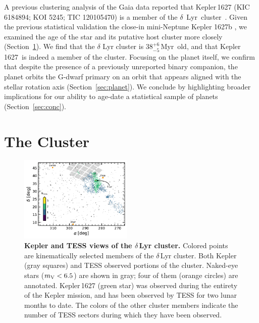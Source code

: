 \documentclass[12pt,modern,twocolumn,tighten]{aastex63}
\newcommand{\cn}{$\delta$\ Lyr\ cluster} %
\newcommand{\sn}{Kepler\,1627} %
\newcommand{\clusterage}{$38^{+6}_{-5}$\,Myr} %
\begin{document}
A previous clustering analysis of the Gaia data reported that
Kepler\,1627 (KIC 6184894; KOI 5245; TIC 120105470) is a member of the
\cn\ \citep{kounkel_untangling_2019}.  Given the previous statistical
validation the close-in mini-Neptune Kepler 1627b
\citep{2012ApJS..199...24T,morton_false_2016,thompson_planetary_2018},
we examined the age of the star and its putative host cluster more
closely (Section~\ref{sec:cluster}).  We find that the $\delta$ Lyr
cluster is \clusterage\ old, and that \sn\ is indeed a member of the
cluster.  Focusing on the planet itself, we confirm that despite the
presence of a previously unreported binary companion, the planet
orbits the G-dwarf primary on an orbit that appears aligned with the
stellar rotation axis (Section~\ref{sec:planet}).  We conclude by
highlighting broader implications for our ability to age-date a
statistical sample of planets (Section~\ref{sec:conc}).


\section{The Cluster}
\label{sec:cluster}

\begin{figure}[t]
	\begin{center}
		\leavevmode
		\includegraphics[width=0.48\textwidth]{f2.pdf}
	\end{center}
	\vspace{-0.7cm}
	\caption{
    {\bf Kepler and TESS views of the $\delta$\,Lyr cluster.} Colored
    points are kinematically selected members of the $\delta$\,Lyr
    cluster.  Both Kepler (gray squares) and TESS observed portions of
    the cluster.  Naked-eye stars ($m_{\rm V}<6.5$) are shown in gray;
    four of them (orange circles) are annotated.
    Kepler\,1627 (green star) was observed during the entirety of the
    Kepler mission, and has been observed by TESS for two lunar months
    to date.  The colors of the other cluster members indicate the
    number of TESS sectors during which they have been observed.
    \label{fig:skychart}
	}
\end{figure}
\end{document}
